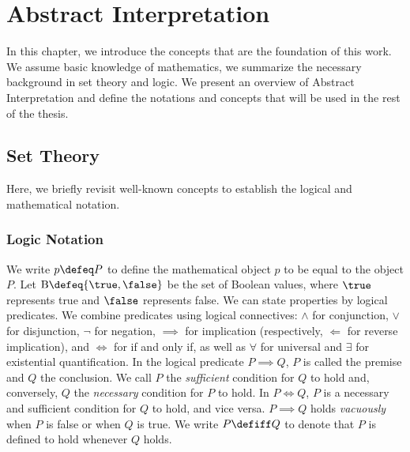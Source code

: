 


\setchapterpreamble[u]{\margintoc}


\chapter{Abstract Interpretation}


\marginemptybox{16cm}

In this chapter, we introduce the concepts that are the foundation of this work.
We assume basic knowledge of mathematics, we summarize the necessary background in set theory and logic.
We present an overview of Abstract Interpretation and define the notations and concepts that will be used in the rest of the thesis.

\section{Set Theory}

Here, we briefly revisit well-known concepts to establish the logical and mathematical notation.

\subsection{Logic Notation}


We write $p \defeq P$ to define the mathematical object $p$ to be equal to the object $P$.
Let $\B \defeq \{\true, \false\}$ be the set of Boolean values, where $\true$ represents true and $\false$ represents false.
We can state properties by logical predicates.
We combine predicates using logical connectives: $\land$ for conjunction, $\lor$ for disjunction, $\neg$ for negation, $\implies$ for implication (respectively, $\Leftarrow$ for reverse implication), and $\iff$ for if and only if, as well as $\forall$ for universal and $\exists$ for existential quantification.
In the logical predicate $P \implies Q$, $P$ is called the premise and $Q$ the conclusion.
We call $P$ the \emph{sufficient} condition for $Q$ to hold and, conversely, $Q$ the \emph{necessary} condition for $P$ to hold.
In $P \iff Q$, $P$ is a necessary and sufficient condition for $Q$ to hold, and vice versa.
$P \implies Q$ holds \emph{vacuously} when $P$ is false or when $Q$ is true.
We write $P \defiff Q$ to denote that $P$ is defined to hold whenever $Q$ holds.

